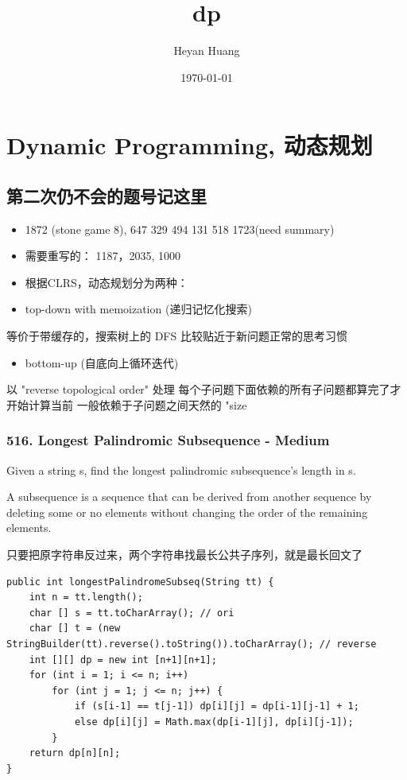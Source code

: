 \documentclass[9pt, b5paaper]{book}
\author{Heyan Huang}
\date{\today}
\title{dp}
\begin{document}
\maketitle
\tableofcontents


\chapter{Dynamic Programming, 动态规划}
\label{sec-1}
\section{第二次仍不会的题号记这里}
\label{sec-1-1}
\begin{itemize}
\item 1872 (stone game 8), 647 329 494 131 518 1723(need summary)

\item 需要重写的： 1187，2035, 1000

\item 根据CLRS，动态规划分为两种：
\item top-down with memoization (递归记忆化搜索)
\end{itemize}
等价于带缓存的，搜索树上的 DFS
比较贴近于新问题正常的思考习惯
\begin{itemize}
\item bottom-up (自底向上循环迭代)
\end{itemize}
以 "reverse topological order" 处理
每个子问题下面依赖的所有子问题都算完了才开始计算当前
一般依赖于子问题之间天然的 "size

\subsection{516. Longest Palindromic Subsequence - Medium}
\label{sec-1-1-1}
Given a string s, find the longest palindromic subsequence's length in s.

A subsequence is a sequence that can be derived from another sequence by deleting some or no elements without changing the order of the remaining elements.

只要把原字符串反过来，两个字符串找最长公共子序列，就是最长回文了

\begin{verbatim}
public int longestPalindromeSubseq(String tt) {
    int n = tt.length();
    char [] s = tt.toCharArray(); // ori
    char [] t = (new StringBuilder(tt).reverse().toString()).toCharArray(); // reverse
    int [][] dp = new int [n+1][n+1];
    for (int i = 1; i <= n; i++) 
        for (int j = 1; j <= n; j++) {
            if (s[i-1] == t[j-1]) dp[i][j] = dp[i-1][j-1] + 1;
            else dp[i][j] = Math.max(dp[i-1][j], dp[i][j-1]);
        }
    return dp[n][n];
}
\end{verbatim}
\end{document}
